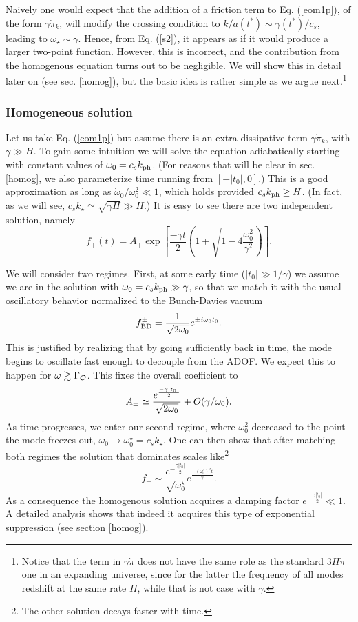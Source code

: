 \documentclass[11pt,amsmath,floats,floatfix,nofootinbib,secnumarabic, superscriptaddress, tightenlines]{revtex4}
\newcommand{\beq}{\begin{equation}}
\newcommand{\eeq}{\end{equation}}
\newcommand{\calo}{{\cal O}}
\begin{document}
Naively one would expect that the addition of a friction term to Eq. (\ref{eom1p}), of the form $\gamma \dot \pi_k$, will modify the crossing condition to $k/a(t^*) \sim \gamma(t^*)/c_s$, leading to $\omega_\star \sim \gamma$. Hence, from Eq. (\ref{s2}), it appears as if it would produce a larger two-point function. However, this is incorrect, and the contribution from the homogenous equation turns out to be negligible. We will show this in detail later on (see sec. \ref{homog}), but the basic idea is rather simple as we argue next.\footnote{Notice that the term in $\gamma\dot\pi$ does not have the same role as the standard $3H\dot\pi$ one in an expanding universe, since for the latter the frequency of all modes redshift at the same rate $H$, while that is not case with $\gamma$.}

\subsubsection{Homogeneous solution}\label{hompart}

Let us take Eq. (\ref{eom1p}) but assume there is an extra dissipative term $\gamma\dot\pi_k$, with $\gamma \gg H$. To gain some intuition we will solve the equation adiabatically starting with constant values of $\omega_0 = c_s k_{\rm ph}$. (For reasons that will be clear in sec. \ref{homog}, we also parameterize time running from $[-|t_0|,0]$.) This is a good approximation as long as $\dot\omega_0/\omega_0^2 \ll 1$, which holds provided $c_s k_{\rm ph} \ge H$. (In fact, as we will see, $c_s k_\star \simeq \sqrt{\gamma H} \gg H$.) It is easy to see there are two independent solution, namely
\beq
f_\mp (t) = A_{\mp} \exp\left[\frac{-\gamma t}{2}\left(1\mp \sqrt{1-4\frac{\omega_0^2}{\gamma^2}}\right)\right].
\eeq

We will consider two regimes. First, at some early time ($|t_0| \gg 1/\gamma$) we assume we are in the solution with $\omega_0 = c_s k_{\rm ph} \gg \gamma$, so that we match it with the usual oscillatory behavior normalized to the Bunch-Davies vacuum
\beq
f^\pm_{\rm BD} = \frac{1}{\sqrt{2\omega_0}} e^{\pm i\omega_0t_0}.
\eeq
This is justified by realizing that by going sufficiently back in time, the mode begins to oscillate fast enough to decouple from the ADOF. We expect this to happen for $\omega\gtrsim \Gamma_\calo$. This fixes the overall coefficient to
\beq
\label{anormp}
A_\pm \simeq  \frac{e^{\frac{-\gamma|t_0|}{2}}}{\sqrt{2\omega_0}} + O(\gamma/\omega_0).\\
\eeq
As time progresses, we enter our second regime, where $\omega^2_0$ decreased to the point the mode freezes out, $\omega_0 \to \omega_0^\star = c_s k_\star$. One can then show that after matching both regimes the solution that dominates scales like\footnote{The other solution decays faster with time.}
\beq
\label{fminus}
f_- \sim \frac{e^{-\frac{\gamma |t_0|}{2}}}{\sqrt{\omega^\star_0}} e^{\frac{-(\omega^\star_0)^2 t}{\gamma}}.
\eeq
As a consequence the homogenous solution acquires a damping factor $e^{-\frac{\gamma |t_0|}{2}} \ll 1$. A detailed analysis shows that indeed it acquires this type of exponential suppression (see section \ref{homog}).\\
\end{document}
